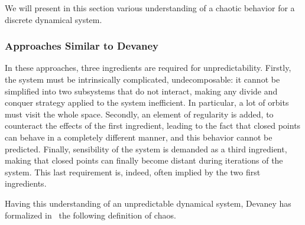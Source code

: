 We will present in this section various understanding of a chaotic behavior for a discrete
dynamical system.

\subsubsection{Approaches Similar to Devaney}


In these approaches, three ingredients are required for unpredictability. 
Firstly, the system must be intrinsically complicated, undecomposable: it cannot be simplified into two
subsystems that do not interact, making any divide and conquer strategy 
applied to the system inefficient. In particular, a lot of orbits must visit
the whole space. Secondly, an element of regularity is added, to counteract
the effects of the first ingredient, leading to the fact that closed points
can behave in a completely different manner, and this behavior cannot be predicted.
Finally, sensibility of the system is demanded as a third ingredient, making that
closed points can finally become distant during iterations of the system.
This last requirement is, indeed, often implied by the two first ingredients.

Having this understanding of an unpredictable dynamical system, Devaney has
formalized in~\cite{Dev89} the following definition of chaos.


